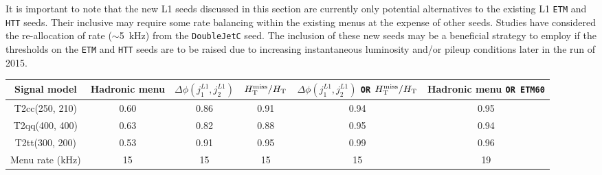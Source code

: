 It is important to note that the new L1 seeds discussed in this
section are currently only potential alternatives to the existing L1
\texttt{ETM} and \texttt{HTT} seeds. Their inclusive may require some
rate balancing within the existing menus at the expense of other
seeds. Studies have considered the re-allocation of rate ($\sim$5~kHz)
from the \texttt{DoubleJetC} seed. The inclusion of these new seeds
may be a beneficial strategy to employ if the thresholds on the
\texttt{ETM} and \texttt{HTT} seeds are to be raised due to increasing
instantaneous luminosity and/or pileup conditions later in the run of
2015.

\begin{table}[h!]
\footnotesize
\centering
\begin{tabular}{cccccc} 
\hline
\hline
  Signal model & Hadronic menu & $\Delta\phi(j_{1}^{L1},j_{2}^{L1})$ & $\mbox{$H_{\rm T}^{\rm miss}$}/\mbox{$H_\text{T}$}$ &$\Delta\phi(j_{1}^{L1},j_{2}^{L1})$ \verb!OR! $\mbox{$H_{\rm T}^{\rm miss}$}/\mbox{$H_\text{T}$}$ & Hadronic menu \verb!OR ETM60! \\
\hline
  T2cc(250, 210)   & 0.60 & 0.86 & 0.91 & 0.94 & 0.95 \\
  T2qq(400, 400)   & 0.63 & 0.82 & 0.88 & 0.95 & 0.94 \\
  T2tt(300, 200)   & 0.53 & 0.91 & 0.95 & 0.99 & 0.96 \\
\hline
  Menu rate (kHz) & 15   & 15   & 15   & 15   & 19   \\
\hline
\hline
\end{tabular}
\label{tab:LowHT_Seed_Signal_2Jet}
\end{table}

